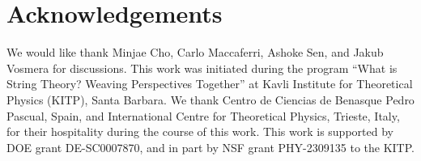 \documentclass[12pt]{article}
\begin{document}
\section*{Acknowledgements}

We would like thank Minjae Cho, Carlo Maccaferri, Ashoke Sen, and Jakub Vosmera for discussions. This work was initiated during the program ``What is String Theory? Weaving Perspectives Together'' at Kavli Institute for Theoretical Physics (KITP), Santa Barbara. We thank Centro de Ciencias de Benasque Pedro Pascual, Spain, and International Centre for Theoretical Physics, Trieste, Italy, for their hospitality during the course of this work. This work is supported by DOE grant DE-SC0007870, and in part by NSF grant PHY-2309135 to the KITP.




\end{document}
